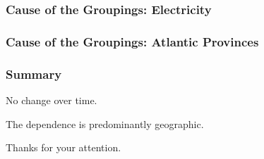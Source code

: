 \documentclass{beamer}
\begin{document}
\begin{frame}
\frametitle{Cause of the Groupings: Electricity}

\end{frame}


\begin{frame}
\frametitle{Cause of the Groupings: Atlantic Provinces}

\end{frame}



\begin{frame}
\frametitle{Summary}

No change over time. 

The dependence is predominantly geographic. 

Thanks for your attention.  

\end{frame}
\end{document}
